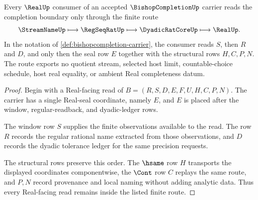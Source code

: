 \begin{theorem}
\label{thm:bishopcompletion-regular-real-boundary}
Every $\RealUp$ consumer of an accepted $\BishopCompletionUp$ carrier reads the completion boundary only through the finite route
$$
\StreamNameUp \longmapsto \RegSeqRatUp \longmapsto \DyadicRatCoreUp \longmapsto \RealUp .
$$
In the notation of \autoref{def:bishopcompletion-carrier}, the consumer reads $S$, then $R$ and $D$, and only then the seal row $E$ together with the structural rows $H,C,P,N$. The route exports no quotient stream, selected host limit, countable-choice schedule, host real equality, or ambient Real completeness datum.
\end{theorem}
\begin{proof}
Begin with a Real-facing read of $B=(R,S,D,E,F,U,H,C,P,N)$. The carrier has a single Real-seal coordinate, namely $E$, and $E$ is placed after the window, regular-readback, and dyadic-ledger rows.

The window row $S$ supplies the finite observations available to the read. The row $R$ records the regular rational name extracted from those observations, and $D$ records the dyadic tolerance ledger for the same precision requests.

The structural rows preserve this order. The $\hsame$ row $H$ transports the displayed coordinates componentwise, the $\Cont$ row $C$ replays the same route, and $P,N$ record provenance and local naming without adding analytic data. Thus every Real-facing read remains inside the listed finite route.
\end{proof}

